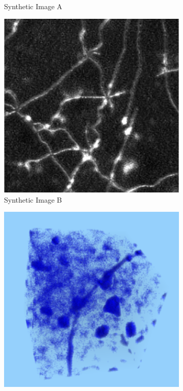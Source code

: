 \begin{figure}[h]
\begin{subfigure}[t]{0.24\textwidth}
    \caption{Synthetic Image A}
    \label{subfig:synthetic}
  \end{subfigure}\hfill
  \begin{subfigure}[t]{0.24\textwidth}
    \includegraphics[width=\textwidth]{figures/conclusion/CapGAN.png}
    \caption{Synthetic Image B}
    \label{subfig:synthetic_b}
  \end{subfigure}\hfill
  \begin{subfigure}[t]{0.24\textwidth}
    \includegraphics[width=\textwidth]{figures/conclusion/3d_resize.png}

\end{subfigure}
\end{figure}
